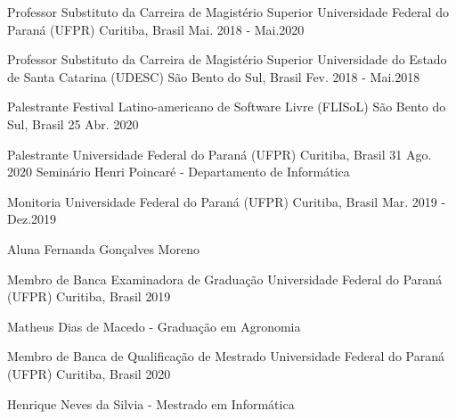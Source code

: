 

\begin{cventries}
   \cventry
	{Professor Substituto da Carreira de Magistério Superior} %
	{Universidade Federal do Paraná (UFPR)} %
	{Curitiba, Brasil} %
	{Mai. 2018 - Mai.2020} %
	{}

	\cventry
	{Professor Substituto da Carreira de Magistério Superior} %
	{Universidade do Estado de Santa Catarina (UDESC)} %
	{São Bento do Sul, Brasil} %
	{Fev. 2018 - Mai.2018} %
	{}
	
	\cventry
	{Palestrante} %
	{Festival Latino-americano de Software Livre (FLISoL)} %
	{São Bento do Sul, Brasil} %
	{25 Abr. 2020} %
	{}
	
	\cventry
	{Palestrante} %
	{Universidade Federal do Paraná (UFPR)} %
	{Curitiba, Brasil} %
	{31 Ago. 2020} %
	{\fontsize{10}{10} Seminário Henri Poincaré - Departamento de Informática}
\end{cventries}


\begin{cventries}
	\cventry
	{Monitoria} %
	{Universidade Federal do Paraná (UFPR)} %
	{Curitiba, Brasil} %
	{Mar. 2019 - Dez.2019} %
	{
		 \begin{cvitems} 
			 \item Aluna Fernanda Gonçalves Moreno
		  \end{cvitems}
	}
\end{cventries}


\begin{cventries}
	\cventry
	{Membro de Banca Examinadora de Graduação} %
	{Universidade Federal do Paraná (UFPR)} %
	{Curitiba, Brasil} %
	{2019} %
	{
		\begin{cvitems} 
			\item Matheus Dias de Macedo - Graduação em Agronomia
		\end{cvitems}
	}

	\cventry
	{Membro de Banca de Qualificação de Mestrado} %
	{Universidade Federal do Paraná (UFPR)} %
	{Curitiba, Brasil} %
	{2020} %
	{
		\begin{cvitems} 
			\item Henrique Neves da Silvia - Mestrado em Informática
		\end{cvitems}
	}
\end{cventries}

